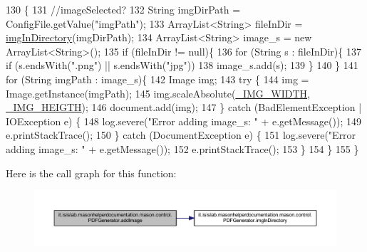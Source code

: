 \begin{DoxyCode}
130                                              \{
131         \textcolor{comment}{//imageSelected?}
132         String imgDirPath = ConfigFile.getValue(\textcolor{stringliteral}{"imgPath"});
133         ArrayList<String> fileInDir = \hyperlink{classit_1_1isislab_1_1masonhelperdocumentation_1_1mason_1_1control_1_1_p_d_f_generator_a9fa1dfe581da4d09e9c7bee1a8b12972}{imgInDirectory}(imgDirPath);
134         ArrayList<String> image\_s = \textcolor{keyword}{new} ArrayList<String>();
135         \textcolor{keywordflow}{if} (fileInDir != null)\{
136             \textcolor{keywordflow}{for} (String s : fileInDir)\{
137                 \textcolor{keywordflow}{if} (s.endsWith(\textcolor{stringliteral}{".png"}) || s.endsWith(\textcolor{stringliteral}{"jpg"}))
138                     image\_s.add(s);
139             \}
140         \}
141         \textcolor{keywordflow}{for} (String imgPath : image\_s)\{
142             Image img;
143             \textcolor{keywordflow}{try} \{
144                 img = Image.getInstance(imgPath);
145                 img.scaleAbsolute(\hyperlink{classit_1_1isislab_1_1masonhelperdocumentation_1_1mason_1_1control_1_1_p_d_f_generator_adf2d9b75632647f25441597140cb36f7}{\_IMG\_WIDTH}, \hyperlink{classit_1_1isislab_1_1masonhelperdocumentation_1_1mason_1_1control_1_1_p_d_f_generator_a7d5a4882865b3339cca7e6b532a4620a}{\_IMG\_HEIGTH});
146                 document.add(img);
147             \} \textcolor{keywordflow}{catch} (BadElementException | IOException e) \{
148                 log.severe(\textcolor{stringliteral}{"Error adding image\_s: "} + e.getMessage());
149                 e.printStackTrace();
150             \} \textcolor{keywordflow}{catch} (DocumentException e) \{
151                 log.severe(\textcolor{stringliteral}{"Error adding image\_s: "} + e.getMessage());
152                 e.printStackTrace();
153             \}
154         \}
155     \}
\end{DoxyCode}


Here is the call graph for this function\-:\nopagebreak
\begin{figure}[H]
\begin{center}
\leavevmode
\includegraphics[width=350pt]{classit_1_1isislab_1_1masonhelperdocumentation_1_1mason_1_1control_1_1_p_d_f_generator_abc1f7c0af1e9a3328d917e6e1751d421_cgraph}
\end{center}
\end{figure}




